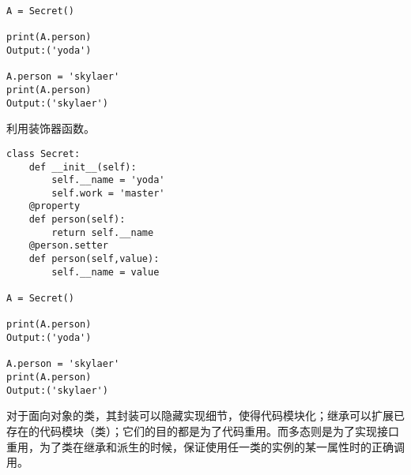 \documentclass[UTF8]{ctexart}
\begin{document}
\begin{flushleft}
\begin{lstlisting}
A = Secret()

print(A.person)
Output:('yoda')

A.person = 'skylaer'
print(A.person)
Output:('skylaer')
\end{lstlisting}
利用装饰器函数。
\begin{lstlisting}
class Secret:
	def __init__(self):
	    self.__name = 'yoda'
	    self.work = 'master'
	@property
	def person(self):
	    return self.__name
	@person.setter
	def person(self,value):
	    self.__name = value
	
A = Secret()
	
print(A.person)
Output:('yoda')
	
A.person = 'skylaer'
print(A.person)
Output:('skylaer')
\end{lstlisting}
\qquad 对于面向对象的类，其封装可以隐藏实现细节，使得代码模块化；继承可以扩展已存在的代码模块（类）；它们的目的都是为了代码重用。而多态则是为了实现接口重用，为了类在继承和派生的时候，保证使用任一类的实例的某一属性时的正确调用。


\end{flushleft}
\end{document}
